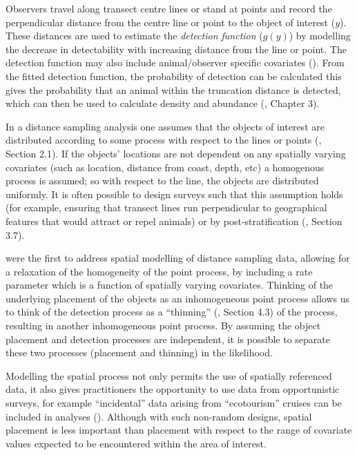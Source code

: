 \documentclass[a4paper,12pt]{article}
\begin{document}
Observers travel along transect centre lines or stand at points and record the perpendicular distance from the centre line or point to the object of interest ($y$). These distances are used to estimate the \textit{detection function} ($g(y)$) by modelling the decrease in detectability with increasing distance from the line or point. The detection function may also include animal/observer specific covariates (\cite{Marques:2007vm}). From the fitted detection function, the probability of detection can be calculated this gives the probability that an animal within the truncation distance is detected, which can then be used to calculate density and abundance (\cite{Buckland:2001vm}, Chapter 3).

In a distance sampling analysis one assumes that the objects of interest are distributed according to some process with respect to the lines or points (\cite{Buckland:2001vm}, Section 2.1). If the objects' locations are not dependent on any spatially varying covariates (such as location, distance from coast, depth, etc) a homogenous process is assumed; so with respect to the line, the objects are distributed uniformly. It is often possible to design surveys such that this assumption holds (for example, ensuring that transect lines run perpendicular to geographical features that would attract or repel animals) or by post-stratification (\cite{Buckland:2001vm}, Section 3.7). 

\cite{Hedley:2004et} were the first to address spatial modelling of distance sampling data, allowing for a relaxation of the homogeneity of the point process, by including a rate parameter which is a function of spatially varying covariates. Thinking of the underlying placement of the objects as an inhomogeneous point process allows us to think of the detection process as a ``thinning'' (\cite{cox1980point}, Section 4.3) of the process, resulting in another inhomogeneous point process. By assuming the object placement and detection processes are independent, it is possible to separate these two processes (placement and thinning) in the likelihood.

Modelling the spatial process not only permits the use of spatially referenced data, it also gives practitioners the opportunity to use data from opportunistic surveys, for example ``incidental'' data arising from ``ecotourism'' cruises can be included in analyses (\cite{Williams:2006tz}). Although with such non-random designs, spatial placement is less important than placement with respect to the range of covariate values expected to be encountered within the area of interest.
\end{document}
